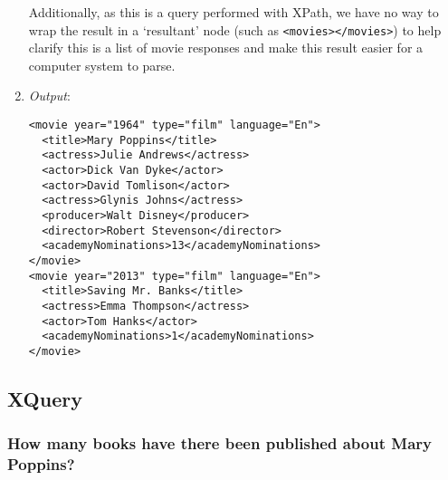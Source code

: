 \documentclass[11pt]{article}
\begin{document}
\begin{enumerate}
Additionally, as this is a query performed with XPath, we have no way to wrap the result in a `resultant' node (such as \texttt{<movies></movies>}) to help clarify this is a list of movie responses and make this result easier for a computer system to parse.

\item \textit{Output}:
\begin{verbatim}
<movie year="1964" type="film" language="En">
  <title>Mary Poppins</title>
  <actress>Julie Andrews</actress>
  <actor>Dick Van Dyke</actor>
  <actor>David Tomlison</actor>
  <actress>Glynis Johns</actress>
  <producer>Walt Disney</producer>
  <director>Robert Stevenson</director>
  <academyNominations>13</academyNominations>
</movie>
<movie year="2013" type="film" language="En">
  <title>Saving Mr. Banks</title>
  <actress>Emma Thompson</actress>
  <actor>Tom Hanks</actor>
  <academyNominations>1</academyNominations>
</movie>
\end{verbatim} 
\end{enumerate}


\subsection{XQuery}

\subsubsection{How many books have there been published about Mary Poppins?}
\end{document}
